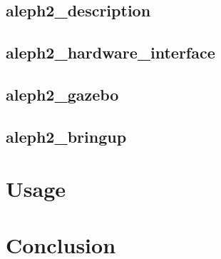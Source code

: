\documentclass[english,inz,shortabstract]{iithesis}
\begin{document}
\section{aleph2\_description}

\section{aleph2\_hardware\_interface}

\section{aleph2\_gazebo}

\section{aleph2\_bringup}

\chapter{Usage}

\chapter{Conclusion}



\end{document}
